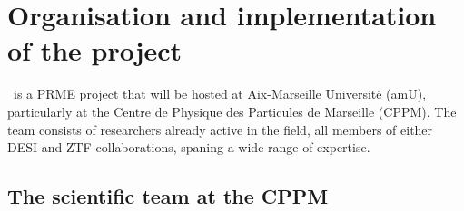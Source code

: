 \section{Organisation and implementation of the project}


 
\projacro\ is a PRME project that will be hosted at Aix-Marseille Université (amU), 
particularly at the Centre de Physique des Particules de Marseille (CPPM). 
The team consists of researchers already active in the field, all members of either 
DESI and ZTF collaborations, spaning a wide range of expertise. 




    
\subsection{The scientific team at the CPPM}



